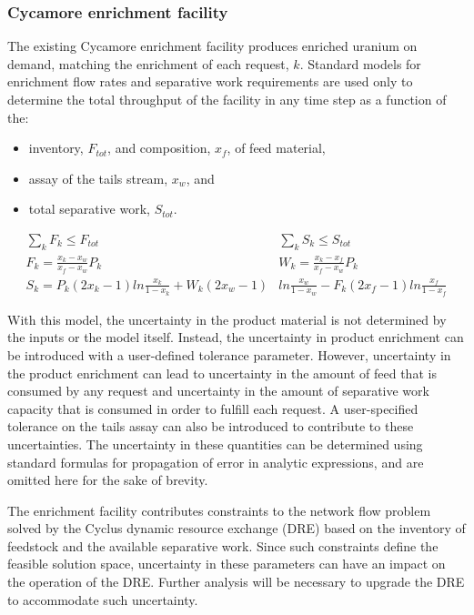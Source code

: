 \documentclass[dvips,12pt]{article}
\begin{document}
\subsubsection{Cycamore enrichment facility}

The existing Cycamore enrichment facility produces
enriched uranium on demand, matching the
enrichment of each request, $k$.  Standard models
for enrichment flow rates and separative work
requirements are used only to determine the total
throughput of the facility in any time step as a
function of the:
\begin{itemize}
\item inventory, $F_{tot}$, and composition,
  $x_f$, of feed material,
\item assay of the tails stream, $x_w$, and
\item total separative work, $S_{tot}$.
\end{itemize}

\begin{align*}
  \sum_k{F_k} \leq F_{tot}\qquad\qquad
  &\sum_k{S_k} \leq S_{tot}\\
  F_k = \frac{x_k - x_w}{x_f - x_w} P_k\qquad\qquad\qquad
  &W_k = \frac{x_k - x_f}{x_f - x_w} P_k\\
  S_k =  P_k\left(2x_k-1\right)ln\frac{x_k}{1-x_k}
         +W_k\left(2x_w-1\right)&ln\frac{x_w}{1-x_w}  
         -F_k\left(2x_f-1\right)ln\frac{x_f}{1-x_f}
\end{align*}

With this model, the uncertainty in the product
material is not determined by the inputs or the
model itself.  Instead, the uncertainty in product
enrichment can be introduced with a user-defined
tolerance parameter.  However, uncertainty in
the product enrichment can lead to uncertainty in
the amount of feed that is consumed by any request
and uncertainty in the amount of separative work
capacity that is consumed in order to fulfill each
request.  A user-specified tolerance on the tails
assay can also be introduced to contribute to
these uncertainties.  The uncertainty in these 
quantities can be determined using standard
formulas for propagation of error in analytic
expressions, and are omitted here for the sake of 
brevity.

The enrichment facility contributes constraints to
the network flow problem solved by the Cyclus
dynamic resource exchange (DRE) based on the
inventory of feedstock and the available
separative work.  Since such constraints define
the feasible solution space, uncertainty in these
parameters can have an impact on the operation of
the DRE.  Further analysis will be necessary to
upgrade the DRE to accommodate such uncertainty.
\end{document}
